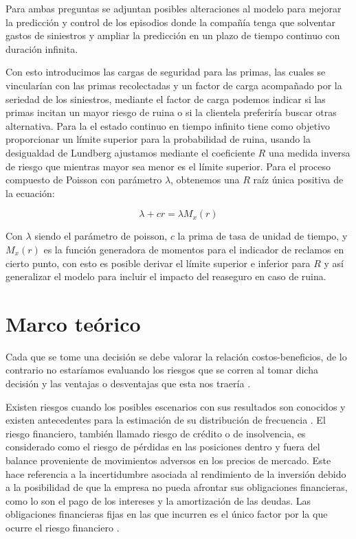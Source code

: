 \documentclass[journal]{IEEEtran}
\begin{document}
        Para ambas preguntas se adjuntan posibles alteraciones al modelo para mejorar la predicción y control de los episodios donde la compañía tenga que solventar gastos de siniestros y ampliar la predicción en un plazo de tiempo continuo con duración infinita.
        
        Con esto introducimos las cargas de seguridad para las primas, las cuales se vincularían con las primas recolectadas y un factor de carga acompañado por la seriedad de los siniestros, mediante el factor de carga podemos indicar si las primas incitan un mayor riesgo de ruina o si la clientela preferiría buscar otras alternativa. Para la el estado continuo en tiempo infinito tiene como objetivo proporcionar un límite superior para la probabilidad de ruina, usando la desigualdad de Lundberg ajustamos mediante el coeficiente $R$ una medida inversa de riesgo que mientras mayor sea menor es el límite superior. Para el proceso compuesto de Poisson con parámetro $\lambda$, obtenemos una $R$ raíz única positiva de la ecuación:
        
        \begin{equation}
            \lambda + cr = \lambda M_x(r)
        \end{equation} 
        
        Con $\lambda$ siendo el parámetro de poisson, $c$ la prima de tasa de unidad de tiempo, y $M_x(r)$ es la función generadora de momentos para el indicador de reclamos en cierto punto, con esto es posible derivar el límite superior e inferior para $R$ y así generalizar el modelo para incluir el impacto del reaseguro en caso de ruina.

    \section{Marco teórico} \label{sec:theoretical-framework}

        Cada que se tome una decisión se debe valorar la relación costos-beneficios, de lo contrario no estaríamos evaluando los riesgos que se corren al tomar dicha decisión y las ventajas o desventajas que esta nos traería \cite{risk-definition}.
            
        Existen riesgos cuando los posibles escenarios con sus resultados son conocidos y existen antecedentes para la estimación de su distribución de frecuencia \cite{Bazzani}. El riesgo financiero, también llamado riesgo de crédito o de insolvencia, es considerado como el riesgo de pérdidas en las posiciones dentro y fuera del balance proveniente de movimientos adversos en los precios de mercado. Este hace referencia a la incertidumbre asociada al rendimiento de la inversión debido a la posibilidad de que la empresa no pueda afrontar sus obligaciones financieras, como lo son el pago de los intereses y la amortización de las deudas. Las obligaciones financieras fijas en las que incurren es el único factor por la que ocurre el riesgo financiero \cite{Bazzani}.
        
\end{document}
